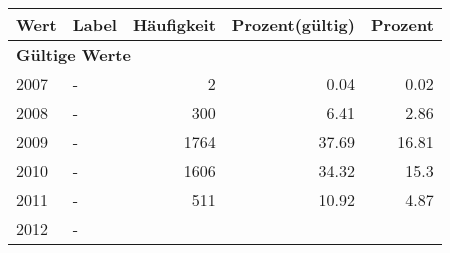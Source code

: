      \begin{longtable}{lXrrr}
     \toprule
     \textbf{Wert} & \textbf{Label} & \textbf{Häufigkeit} & \textbf{Prozent(gültig)} & \textbf{Prozent} \\
     \endhead
     \midrule
     \multicolumn{5}{l}{\textbf{Gültige Werte}}\\

     2007 &
     \multicolumn{1}{X}{ -  } &


       \num{2} &
       \num[round-mode=places,round-precision=2]{0,04} &
         \num[round-mode=places,round-precision=2]{0,02} \\

     2008 &
     \multicolumn{1}{X}{ -  } &


       \num{300} &
       \num[round-mode=places,round-precision=2]{6,41} &
         \num[round-mode=places,round-precision=2]{2,86} \\

     2009 &
     \multicolumn{1}{X}{ -  } &


       \num{1764} &
       \num[round-mode=places,round-precision=2]{37,69} &
         \num[round-mode=places,round-precision=2]{16,81} \\

     2010 &
     \multicolumn{1}{X}{ -  } &


       \num{1606} &
       \num[round-mode=places,round-precision=2]{34,32} &
         \num[round-mode=places,round-precision=2]{15,3} \\

     2011 &
     \multicolumn{1}{X}{ -  } &


       \num{511} &
       \num[round-mode=places,round-precision=2]{10,92} &
         \num[round-mode=places,round-precision=2]{4,87} \\

     2012 &
     \multicolumn{1}{X}{ -  } &



\end{longtable}
